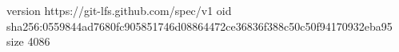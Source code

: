 version https://git-lfs.github.com/spec/v1
oid sha256:0559844ad7680fc905851746d08864472ce36836f388c50c50f94170932eba95
size 4086
